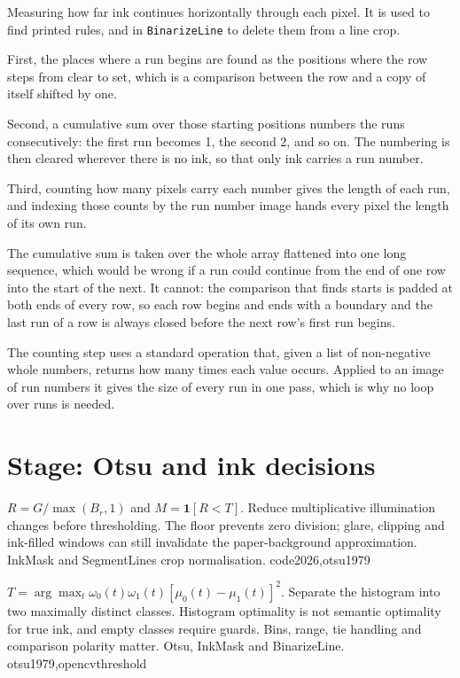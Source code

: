 Measuring how far ink continues horizontally through each pixel. It is used to find printed rules, and in \texttt{BinarizeLine} to delete them from a line crop.


First, the places where a run begins are found as the positions where the row steps from clear to set, which is a comparison between the row and a copy of itself shifted by one.

Second, a cumulative sum over those starting positions numbers the runs consecutively: the first run becomes 1, the second 2, and so on. The numbering is then cleared wherever there is no ink, so that only ink carries a run number.

Third, counting how many pixels carry each number gives the length of each run, and indexing those counts by the run number image hands every pixel the length of its own run.


The cumulative sum is taken over the whole array flattened into one long sequence, which would be wrong if a run could continue from the end of one row into the start of the next. It cannot: the comparison that finds starts is padded at both ends of every row, so each row begins and ends with a boundary and the last run of a row is always closed before the next row's first run begins.


The counting step uses a standard operation that, given a list of non-negative whole numbers, returns how many times each value occurs. Applied to an image of run numbers it gives the size of every run in one pass, which is why no loop over runs is needed.



\section*{Stage: Otsu and ink decisions}
{$R=G/\max(B_r,1)$ and $M=\mathbf1[R<T]$.}
{Reduce multiplicative illumination changes before thresholding. The floor
prevents zero division; glare, clipping and ink-filled windows can still
invalidate the paper-background approximation.}
{InkMask and SegmentLines crop normalisation.}
{code2026,otsu1979}

{$T=\arg\max_t\omega_0(t)\omega_1(t)[\mu_0(t)-\mu_1(t)]^2$.}
{Separate the histogram into two maximally distinct classes. Histogram
optimality is not semantic optimality for true ink, and empty classes require
guards. Bins, range, tie handling and comparison polarity matter.}
{Otsu, InkMask and BinarizeLine.}
{otsu1979,opencvthreshold}

